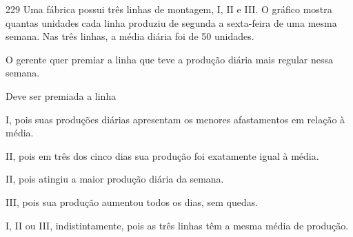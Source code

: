\begin{questaoinedita}{2}{29}
Uma fábrica possui três linhas de montagem, I, II e III. O gráfico mostra quantas unidades cada linha
produziu de segunda a sexta-feira de uma mesma semana. Nas três linhas, a média diária foi de
50 unidades.
\begin{center}
\end{center}
O gerente quer premiar a linha que teve a produção diária mais regular nessa semana.

Deve ser premiada a linha
\begin{alternativas}
\item I, pois suas produções diárias apresentam os menores afastamentos em relação à média.
\item II, pois em três dos cinco dias sua produção foi exatamente igual à média.
\item II, pois atingiu a maior produção diária da semana.
\item III, pois sua produção aumentou todos os dias, sem quedas.
\item I, II ou III, indistintamente, pois as três linhas têm a mesma média de produção.
\end{alternativas}
\end{questaoinedita}
